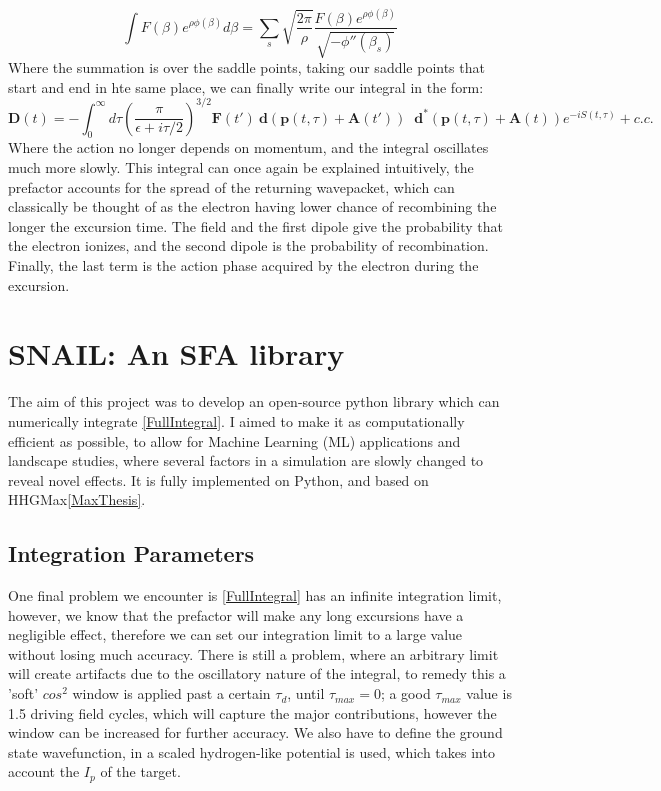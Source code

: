 \documentclass[11pt,a4paper]{report}
\begin{document}
\begin{equation}
\int F(\beta) e^{\rho\phi(\beta)} d\beta = \sum_s \sqrt{\frac{2\pi}{\rho}} \frac{F(\beta)e^{\rho\phi(\beta)}}{\sqrt{-\phi '' (\beta_s)}}
\end{equation}
Where the summation is over the saddle points, taking our saddle points that start and end in hte same place, we can finally write our integral in the form:
\begin{equation}
\mathbf{D}(t) = -\int_0^{\infty} d\tau \left( \frac{\pi}{\epsilon + i\tau/2}\right)^{3/2}\mathbf{F}(t')\: \mathbf{d} (\mathbf{p}(t,\tau) + \mathbf{A}(t'))\;\;\mathbf{d}^* (\mathbf{p}(t,\tau) + \mathbf{A}(t))  e^{-iS(t,\tau)} + c.c.
	\label{FullIntegral}
\end{equation}
Where the action no longer depends on momentum, and the integral oscillates much more slowly. This integral can once again be explained intuitively, the prefactor accounts for the spread of the returning wavepacket, which can classically be thought of as the electron having lower chance of recombining the longer the excursion time. The field and the first dipole give the probability that the electron ionizes, and the second dipole is the probability of recombination. Finally, the last term is the action phase acquired by the electron during the excursion.
\newpage
{}
\chapter{SNAIL: An SFA library}
\vspace{-10mm}
The aim of this project was to develop an open-source python library which can numerically integrate \eqref{FullIntegral}. I aimed to make it as computationally efficient as possible, to allow for Machine Learning (ML) applications and landscape studies, where several factors in a simulation are slowly changed to reveal novel effects. It is fully implemented on Python, and based on HHGMax\ref{MaxThesis}.
\section{Integration Parameters}
One final problem we encounter is \eqref{FullIntegral} has an infinite integration limit, however, we know that the prefactor will make any long excursions have a negligible effect, therefore we can set our integration limit to a large value without losing much accuracy. There is still a problem, where an arbitrary limit will create artifacts due to the oscillatory nature of the integral, to remedy this a 'soft' $cos^2$ window is applied past a certain $\tau_{d}$, until $\tau_{max} = 0$; a good $\tau_{max}$ value is 1.5 driving field cycles, which will capture the major contributions, however the window can be increased for further accuracy. We also have to define the ground state wavefunction, in \cite{lewensteinog} a scaled hydrogen-like potential is used, which takes into account the $I_p$ of the target.\\
\end{document}
